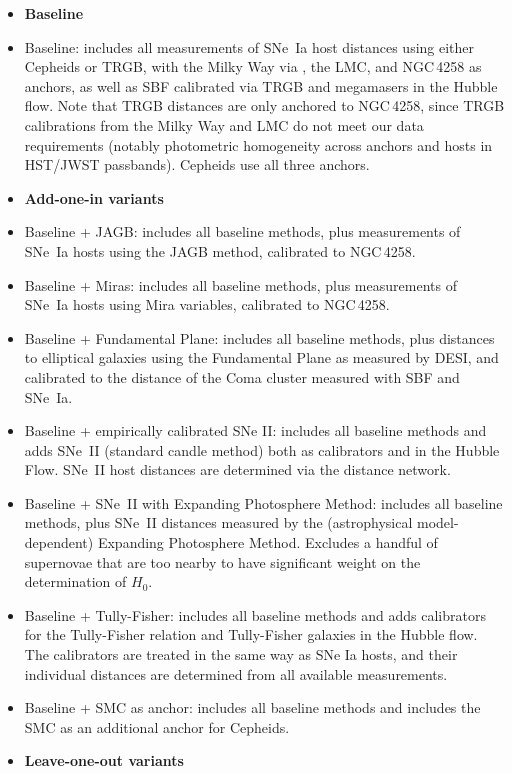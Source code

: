\begin{itemize}
\item[]\textbf{Baseline}
    \item[V00] Baseline: includes all measurements of SNe~Ia host distances using either Cepheids or TRGB, with the Milky Way via \gaia, the LMC, and NGC$\,$4258 as anchors, as well as SBF calibrated via TRGB and megamasers in the Hubble flow.   Note that TRGB distances are only anchored to NGC$\,$4258, since TRGB calibrations from the Milky Way and LMC do not meet our data requirements (notably photometric homogeneity across anchors and hosts in HST/JWST passbands).  Cepheids use all three anchors.  
    \smallskip\item[]\textbf{Add-one-in variants}
    \item[V01] Baseline + JAGB: includes all baseline methods, plus measurements of SNe~Ia hosts using the JAGB method, calibrated to NGC$\,$4258.
    \item[V02] Baseline + Miras: includes all baseline methods, plus measurements of SNe~Ia hosts using  Mira variables, calibrated to NGC$\,$4258.
    \item[V03] Baseline + Fundamental Plane: includes all baseline methods, plus distances to elliptical galaxies using the Fundamental Plane as measured by DESI, and calibrated to the distance of the Coma cluster measured with SBF and SNe~Ia.
    \item[V04] Baseline + empirically calibrated SNe II: includes all baseline methods and adds SNe~II (standard candle method) both as calibrators and in the Hubble Flow.  SNe~II host distances are determined via the distance network.
    \item[V05] Baseline + SNe~II with Expanding Photosphere Method: includes all baseline methods, plus SNe~II distances measured by the (astrophysical model-dependent) Expanding Photosphere Method.  Excludes a handful of supernovae that are too nearby to have significant weight on the determination of $ H_0 $.
    \item[V06] Baseline + Tully-Fisher: includes all baseline methods and adds calibrators for the Tully-Fisher relation and Tully-Fisher galaxies in the Hubble flow. The calibrators are treated in the same way as SNe Ia hosts, and their individual distances are determined from all available measurements.
    \item[V07] Baseline + SMC as anchor: includes all baseline methods and includes the SMC as an additional anchor for Cepheids.
    \smallskip\item[]\textbf{Leave-one-out variants}

\end{itemize}
